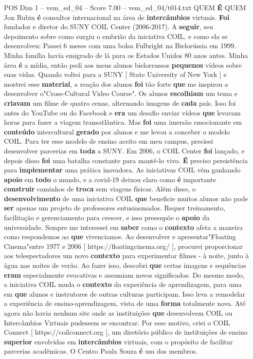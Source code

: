 \begin{textsample}{POS Dim 1 – vem\_ed\_04 – Score 7.00 – vem\_ed\_04/t014.txt}  \label{ex:f1_pos_180}
QUEM \textbf{É} QUEM Jon Rubin \textbf{é} consultor internacional na área de \textbf{intercâmbios} virtuais. \textbf{Foi} fundador e diretor do SUNY COIL Center (2006-2017).
A \textbf{seguir}, seu depoimento sobre como surgiu o embrião da iniciativa COIL, e como ela se desenvolveu: Passei 6 meses com uma bolsa Fulbright na Bielorússia em 1999.
Minha família havia emigrado de lá para os Estados Unidos 80 anos antes.
Minha área \textbf{é} a mídia, então pedi aos meus alunos bielorrussos \textbf{pequenos} vídeos sobre suas vidas.
Quando voltei para a SUNY [ State University of New York ] e mostrei esse \textbf{material}, a reação dos alunos \textbf{foi} tão forte \textbf{que} me inspirou a desenvolver o"Cross-Cultural Video Course".
Os alunos \textbf{escolhiam} um tema e \textbf{criavam} um filme de quatro cenas, alternando imagens de \textbf{cada} país.
Isso foi antes do YouTube ou do Facebook e \textbf{era} um desafio enviar vídeos \textbf{que} levavam horas para fazer a viagem transatlântica.
Mas \textbf{foi} uma imersão emocionante em \textbf{conteúdo} intercultural \textbf{gerado} por alunos e me levou a conceber o modelo COIL.
Para ter esse modelo de ensino aceito em meu campus, precisei desenvolver parcerias em \textbf{toda} a SUNY.
Em 2006, o COIL Center \textbf{foi} lançado, e depois disso \textbf{foi} uma batalha constante para mantê-lo vivo. \textbf{É} preciso persistência para \textbf{implementar} uma prática inovadora.
As iniciativas COIL vêm ganhando \textbf{apoio} em \textbf{todo} o mundo, e a covid-19 deixou claro como \textbf{é} importante \textbf{construir} caminhos de \textbf{troca} sem viagens físicas.
Além disso, o \textbf{desenvolvimento} de uma iniciativa COIL \textbf{que} beneficie muitos alunos não pode \textbf{ser} apenas um projeto de professores entusiasmados.
Requer treinamento, facilitação e gerenciamento para crescer, e isso pressupõe o \textbf{apoio} da universidade.
Sempre me interessei em \textbf{saber} como o \textbf{contexto} afeta a maneira como respondemos ao \textbf{que} vivenciamos.
Ao desenvolver e apresentar"Floating Cinema"entre 1977 e 2006 [ https://floatingcinema.org/ ], procurei proporcionar aos telespectadores um novo \textbf{contexto} para experimentar filmes - à noite, junto à água nas noites de verão.
Ao fazer isso, descobri \textbf{que} certas imagens e sequências \textbf{eram} especialmente evocativas e assumiam novos significados.
Do mesmo modo, a iniciativa COIL muda o \textbf{contexto} da experiência de aprendizagem, para uma em \textbf{que} alunos e instrutores de outras culturas participam.
Isso leva a remodelar a experiência de ensino-aprendizagem, vista de uma \textbf{forma} totalmente nova.
Até agora não havia nenhum site onde as instituições \textbf{que} desenvolvem COIL ou Intercâmbios Virtuais pudessem se encontrar.
Por esse motivo, criei o COIL Connect [ https://coilconnect.org ], um diretório público de instituições de ensino \textbf{superior} envolvidas em \textbf{intercâmbios} virtuais, com o propósito de facilitar parcerias acadêmicas.
O Centro Paula Souza \textbf{é} um dos membros.


\end{textsample}
